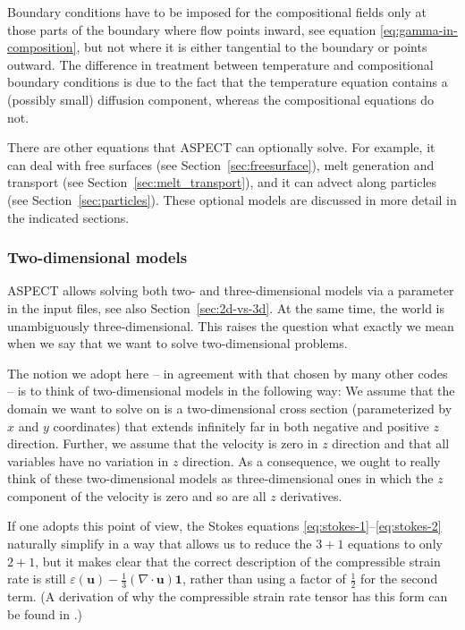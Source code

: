 \documentclass{article}
\newcommand{\aspect}{\textsc{ASPECT}}
\begin{document}
Boundary conditions have to be imposed for the compositional fields only
at those parts of the boundary where flow points inward, see equation
\eqref{eq:gamma-in-composition}, but not where it is either tangential
to the boundary or points outward. The difference in treatment between
temperature and compositional boundary conditions is due to the fact
that the temperature equation contains a (possibly small) diffusion
component, whereas the compositional equations do not.

There are other equations that \aspect{} can optionally solve. For example, it
can deal with free surfaces (see Section~\ref{sec:freesurface}), melt generation and
transport (see Section~\ref{sec:melt_transport}), and it can advect along
particles (see Section~\ref{sec:particles}). These optional models
are discussed in more detail in the indicated sections.


\subsubsection{Two-dimensional models}
\label{sec:meaning-of-2d}
\aspect{} allows solving both two- and three-dimensional
models via a parameter in the input files, see also Section~\ref{sec:2d-vs-3d}.
 
At the same time, the world is unambiguously three-dimensional. This raises the
question what exactly we mean when we say that we want to solve two-dimensional
problems.

The notion we adopt here -- in agreement with that chosen by many other codes --
is to think of two-dimensional models in the following way: We assume that the
domain we want to solve on is a two-dimensional cross section (parameterized by
$x$ and $y$ coordinates) that extends infinitely far in both negative and
positive $z$ direction. Further, we assume that the velocity is zero in $z$
direction and that all variables have no variation in $z$ direction. As a
consequence, we ought to really think of these two-dimensional models as
three-dimensional ones in which the $z$ component of the velocity is zero and so
are all $z$ derivatives.

If one adopts this point of view, the Stokes equations
\eqref{eq:stokes-1}--\eqref{eq:stokes-2} naturally simplify in a way that allows
us to reduce the $3+1$ equations to only $2+1$, but it makes clear that the
correct description of the compressible strain rate is still
$\varepsilon(\mathbf u) - \frac{1}{3}(\nabla \cdot \mathbf u)\mathbf 1$, rather
than using a factor of $\frac{1}{2}$ for the second term. (A derivation of why
the compressible strain rate tensor has this form can be found in \cite[Section
6.5]{STO01}.)
\end{document}
